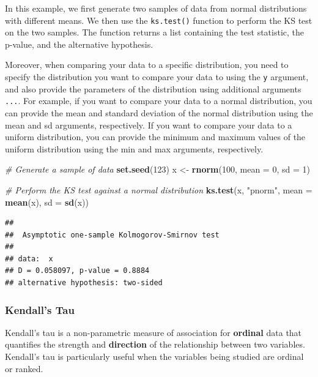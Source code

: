 \documentclass[
]{ctexart}
\newenvironment{Shaded}{\begin{snugshade}}{\end{snugshade}}
\newcommand{\AttributeTok}[1]{\textcolor[rgb]{0.13,0.29,0.53}{#1}}
\newcommand{\CommentTok}[1]{\textcolor[rgb]{0.56,0.35,0.01}{\textit{#1}}}
\newcommand{\DecValTok}[1]{\textcolor[rgb]{0.00,0.00,0.81}{#1}}
\newcommand{\FunctionTok}[1]{\textcolor[rgb]{0.13,0.29,0.53}{\textbf{#1}}}
\newcommand{\NormalTok}[1]{#1}
\newcommand{\OtherTok}[1]{\textcolor[rgb]{0.56,0.35,0.01}{#1}}
\newcommand{\StringTok}[1]{\textcolor[rgb]{0.31,0.60,0.02}{#1}}
\begin{document}
In this example, we first generate two samples of data from normal
distributions with different means. We then use the \texttt{ks.test()}
function to perform the KS test on the two samples. The function returns
a list containing the test statistic, the p-value, and the alternative
hypothesis.

Moreover, when comparing your data to a specific distribution, you need
to specify the distribution you want to compare your data to using the
\texttt{y} argument, and also provide the parameters of the distribution
using additional arguments \texttt{...}. For example, if you want to
compare your data to a normal distribution, you can provide the mean and
standard deviation of the normal distribution using the mean and sd
arguments, respectively. If you want to compare your data to a uniform
distribution, you can provide the minimum and maximum values of the
uniform distribution using the min and max arguments, respectively.

\begin{Shaded}
\begin{Highlighting}[]
\CommentTok{\# Generate a sample of data}
\FunctionTok{set.seed}\NormalTok{(}\DecValTok{123}\NormalTok{)}
\NormalTok{x }\OtherTok{\textless{}{-}} \FunctionTok{rnorm}\NormalTok{(}\DecValTok{100}\NormalTok{, }\AttributeTok{mean =} \DecValTok{0}\NormalTok{, }\AttributeTok{sd =} \DecValTok{1}\NormalTok{)}

\CommentTok{\# Perform the KS test against a normal distribution}
\FunctionTok{ks.test}\NormalTok{(x, }\StringTok{"pnorm"}\NormalTok{, }\AttributeTok{mean =} \FunctionTok{mean}\NormalTok{(x), }\AttributeTok{sd =} \FunctionTok{sd}\NormalTok{(x))}
\end{Highlighting}
\end{Shaded}

\begin{verbatim}
## 
##  Asymptotic one-sample Kolmogorov-Smirnov test
## 
## data:  x
## D = 0.058097, p-value = 0.8884
## alternative hypothesis: two-sided
\end{verbatim}

\hypertarget{kendalls-tau}{%
\subsubsection{Kendall's Tau}\label{kendalls-tau}}

Kendall's tau is a non-parametric measure of association for
\textbf{ordinal} data that quantifies the strength and
\textbf{direction} of the relationship between two variables. Kendall's
tau is particularly useful when the variables being studied are ordinal
or ranked.
\end{document}
